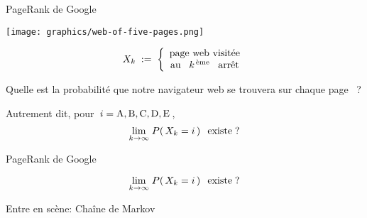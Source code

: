 \begin{frame}{\Large PageRank de Google}

\begin{multicols}{2}
	\begin{minipage}{4.5cm}
	\begin{center}
	\texttt{[image: graphics/web-of-five-pages.png]}
	\end{center}
	\end{minipage}
\columnbreak
	\begin{flushright}
	\begin{minipage}{5.5cm}
	\vskip -1.25cm
	\begin{equation*}
	X_{k} \; := \;
		\left\{\begin{array}{c}
		\textnormal{page web visit\'ee}
		\\
		\textnormal{au \, $k^{\textnormal{\,\`eme}}$ \, arr\^et}
		\end{array}\right.
	\end{equation*}
	\begin{center}
	\large Quelle est la probabilit\'e que
	\vskip 0.025cm
	notre navigateur web
	\vskip 0.025cm
	se trouvera sur chaque page
	\vskip 0.025cm
	\, ?
	\end{center}
	\end{minipage}
	\end{flushright}
\end{multicols}

\vskip 0.1cm

\pause
\large Autrement dit, pour \,$i = \textnormal{A}, \textnormal{B}, \textnormal{C}, \textnormal{D}, \textnormal{E}$\,,
\huge
\begin{equation*}
\underset{k\rightarrow\infty}{\lim}\;P\!\left(\,X_{k} = i\,\right)
\;\;\textnormal{existe\;?}
\end{equation*}


\end{frame}


\begin{frame}{\Large PageRank de Google}

\vskip -0.75cm

\huge
\begin{equation*}
\underset{k\rightarrow\infty}{\lim}\;P\!\left(\,X_{k} = i\,\right)
\;\;\textnormal{existe\;?}
\end{equation*}

\vskip 0.75cm

\begin{center}
\pause {}
\vskip 0.75cm
\pause \Large Entre en sc\`ene: Cha\^{i}ne de Markov
\end{center}

\end{frame}
\normalsize

